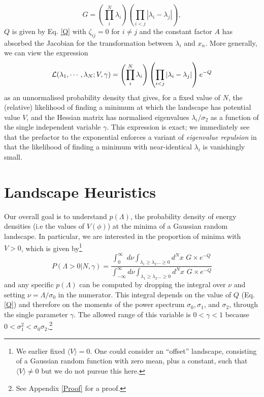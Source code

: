 \documentclass[12pt]{article}
\begin{document}
\begin{equation}
G = \left(\prod_{i}^{N} \lambda_i \right)\left(\prod_{i<j} |\lambda_i-\lambda_j|\right),
\end{equation} 
%
$Q$ is given by Eq. \ref{Q} with $\zeta_{ij}=0$ for $i\neq j$ and the constant factor $A$ has absorbed the Jacobian for the transformation between $\lambda_i$ and $x_n$. More generally, we can view the expression
%
\begin{equation}
{\cal L}(\lambda_1,\cdots, \lambda_N; V, \gamma) = \left(\prod_{i}^{N} \lambda_i \right)\left(\prod_{i<j} |\lambda_i-\lambda_j|\right) e^{-Q}
\end{equation} 
%
as an unnormalised probability density that gives, for a fixed value of $N$, the (relative) likelihood of finding a minimum at which the landscape has potential value $V$, and the Hessian matrix has normalised eigenvalues $\lambda_i/\sigma_2$ as a function of the single independent variable $\gamma$. This expression is exact;  we immediately see that the prefactor to the exponential enforces a variant of {\em eigenvalue repulsion\/} \cite{Mehta1990}  in that the likelihood of finding a minimum with near-identical $\lambda_i$ is vanishingly small. 



\section{Landscape Heuristics}

Our  overall goal is to understand $p(\Lambda)$, the probability density of energy densities (i.e the values of $V(\phi)$) at the minima of a Gaussian random landscape. In particular, we are interested in the proportion of  minima with $V > 0$, which is given by\footnote{We  earlier fixed $\langle V \rangle = 0$. One could consider an ``offset'' landscape, consisting of a Gaussian random function with zero mean, plus a constant, such that $\langle V \rangle \neq 0$ but we do not pursue this here.}
\begin{equation} \label{PminIntegral}
  P(\Lambda >0| N,\gamma) =  \frac{\int^\infty_0 \,\,d\nu \int_{\lambda_1 \geq \lambda_2 \ldots \geq 0} d^Nx \,\, G \times e^{-Q} }{\int^\infty_{-\infty} d\nu \int_{\lambda_1 \geq \lambda_2 \ldots \geq 0} d^Nx\,\,G \times e^{-Q}}
  \end{equation}
 and any specific $p(\Lambda)$ can be computed by dropping the integral over $\nu$ and setting $\nu=\Lambda/\sigma_0$ in the numerator.  
%
This integral depends on the value of $Q$ (Eq. \ref{Q}) and therefore on the moments of the power spectrum $\sigma_0, \sigma_1$,  and $\sigma_2$, through the single parameter $\gamma$. The allowed range of this variable is $0<\gamma<1$ because $0<\sigma_1^2<\sigma_0\sigma_2$.\footnote{See Appendix \ref{Proof} for a proof.}
\end{document}
